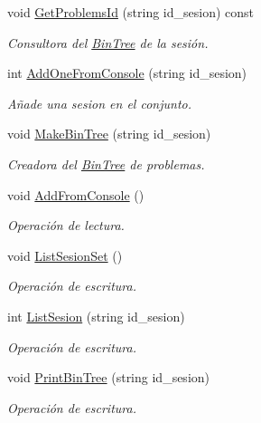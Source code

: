 \begin{DoxyCompactItemize}
void \mbox{\hyperlink{class_sesion_set_a40ab167ffeda96c90a899c669b7c8a7c}{Get\+Problems\+Id}} (string id\+\_\+sesion) const
\begin{DoxyCompactList}\small\item\em Consultora del \mbox{\hyperlink{class_bin_tree}{Bin\+Tree}} de la sesión. \end{DoxyCompactList}\item 
int \mbox{\hyperlink{class_sesion_set_a74a8b110d55902c12d867e090c6092c2}{Add\+One\+From\+Console}} (string id\+\_\+sesion)
\begin{DoxyCompactList}\small\item\em Añade una sesion en el conjunto. \end{DoxyCompactList}\item 
void \mbox{\hyperlink{class_sesion_set_af1acf5c32c501d5fa3e6a282ec3c176e}{Make\+Bin\+Tree}} (string id\+\_\+sesion)
\begin{DoxyCompactList}\small\item\em Creadora del \mbox{\hyperlink{class_bin_tree}{Bin\+Tree}} de problemas. \end{DoxyCompactList}\item 
void \mbox{\hyperlink{class_sesion_set_a683506f0dc85b15392e77ebe4e6cc266}{Add\+From\+Console}} ()
\begin{DoxyCompactList}\small\item\em Operación de lectura. \end{DoxyCompactList}\item 
void \mbox{\hyperlink{class_sesion_set_a33e38d89cd960e91aa593ca99fdbee3d}{List\+Sesion\+Set}} ()
\begin{DoxyCompactList}\small\item\em Operación de escritura. \end{DoxyCompactList}\item 
int \mbox{\hyperlink{class_sesion_set_a5edd3e0c7231ffd474be2f350f116fcb}{List\+Sesion}} (string id\+\_\+sesion)
\begin{DoxyCompactList}\small\item\em Operación de escritura. \end{DoxyCompactList}\item 
void \mbox{\hyperlink{class_sesion_set_a61757f0827ae258cc37fcd3574e20b70}{Print\+Bin\+Tree}} (string id\+\_\+sesion)
\begin{DoxyCompactList}\small\item\em Operación de escritura. \end{DoxyCompactList}\end{DoxyCompactItemize}


